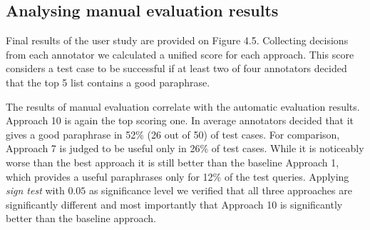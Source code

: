 \subsection{Analysing manual evaluation results}

Final results of the user study are provided on Figure 4.5. Collecting decisions from each annotator we calculated a unified score for each approach. This score considers a test case to be successful if at least two of four annotators decided that the top 5 list contains a good paraphrase. 

The results of manual evaluation correlate with the automatic evaluation results. Approach 10 is again the top scoring one. In average annotators decided that it gives a good paraphrase in 52\% (26 out of 50) of test cases. For comparison, Approach 7 is judged to be useful only in 26\% of test cases. While it is noticeably worse than the best approach it is still better than the baseline Approach 1, which provides a useful paraphrases only for 12\% of the test queries. Applying \emph{sign test} with $0.05$ as significance level we verified that all three approaches are significantly different and most importantly that Approach 10 is significantly better than the baseline approach.